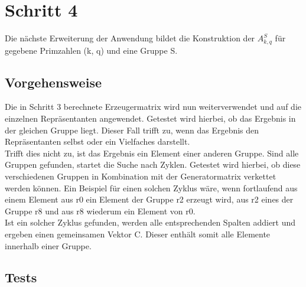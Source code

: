 \section{Schritt 4}
Die nächste Erweiterung der Anwendung bildet die Konstruktion der $A^{S}_{k,q}$ für gegebene Primzahlen (k, q) und eine Gruppe S.

\subsection{Vorgehensweise}
Die in Schritt 3 berechnete Erzeugermatrix wird nun weiterverwendet und auf die einzelnen Repräsentanten angewendet. Getestet wird hierbei, ob das Ergebnis in der gleichen Gruppe liegt. Dieser Fall trifft zu, wenn das Ergebnis den Repräsentanten selbst oder ein Vielfaches darstellt. \\
Trifft dies nicht zu, ist das Ergebnis ein Element einer anderen Gruppe. Sind alle Gruppen gefunden, startet die Suche nach Zyklen. Getestet wird hierbei, ob diese verschiedenen Gruppen in Kombination mit der Generatormatrix verkettet werden können. Ein Beispiel für einen solchen Zyklus wäre, wenn fortlaufend aus einem Element aus r0 ein Element der Gruppe r2 erzeugt wird, aus r2 eines der Gruppe r8 und aus r8 wiederum ein Element von r0.\\
Ist ein solcher Zyklus gefunden, werden alle entsprechenden Spalten addiert und ergeben einen gemeinsamen Vektor C. Dieser enthält somit alle Elemente innerhalb einer Gruppe.


\subsection{Tests}